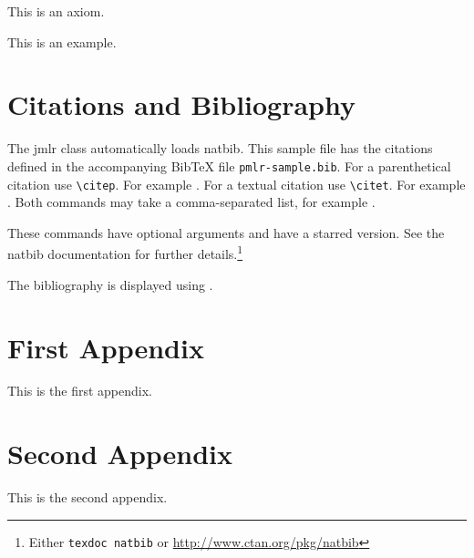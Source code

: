 \documentclass[pmlr]{jmlr}%
\begin{document}
\begin{axiom}\label{ax:sample}
This is an axiom.
\end{axiom}

\begin{example}[An Example]\label{ex:sample}
This is an example.
\end{example}

\section{Citations and Bibliography}
\label{sec:cite}

The \textsf{jmlr} class automatically loads \textsf{natbib}.
This sample file has the citations defined in the accompanying
BibTeX file \texttt{pmlr-sample.bib}. For a parenthetical
citation use \verb|\citep|. For example
\citep{guyon-elisseeff-03}. For a textual citation use
\verb|\citet|. For example \citet{guyon2007causalreport}.
Both commands may take a comma-separated list, for example
\citet{guyon-elisseeff-03,guyon2007causalreport}.

These commands have optional arguments and have a starred
version. See the \textsf{natbib} documentation for further
details.\footnote{Either \texttt{texdoc natbib} or
\url{http://www.ctan.org/pkg/natbib}}

The bibliography is displayed using \verb||.




\appendix

\section{First Appendix}\label{apd:first}

This is the first appendix.

\section{Second Appendix}\label{apd:second}

This is the second appendix.
\end{document}
